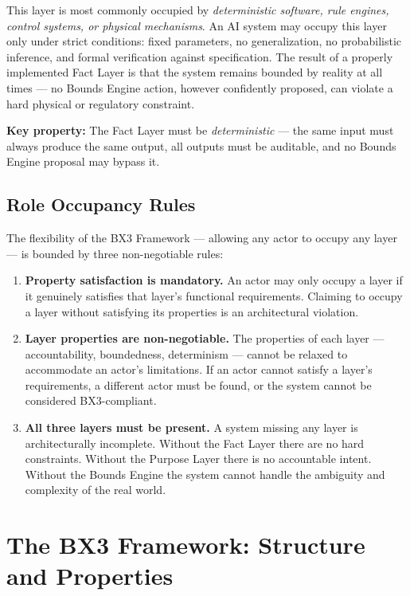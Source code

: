 \documentclass[12pt]{article}
\begin{document}
This layer is most commonly occupied by \textit{deterministic software, rule engines, control systems, or physical mechanisms}. An AI system may occupy this layer only under strict conditions: fixed parameters, no generalization, no probabilistic inference, and formal verification against specification. The result of a properly implemented Fact Layer is that the system remains bounded by reality at all times --- no Bounds Engine action, however confidently proposed, can violate a hard physical or regulatory constraint.

\textbf{Key property:} The Fact Layer must be \textit{deterministic} --- the same input must always produce the same output, all outputs must be auditable, and no Bounds Engine proposal may bypass it.

\subsection{Role Occupancy Rules}

The flexibility of the BX3 Framework --- allowing any actor to occupy any layer --- is bounded by three non-negotiable rules:

\begin{enumerate}[noitemsep]
    \item \textbf{Property satisfaction is mandatory.} An actor may only occupy a layer if it genuinely satisfies that layer's functional requirements. Claiming to occupy a layer without satisfying its properties is an architectural violation.
    \item \textbf{Layer properties are non-negotiable.} The properties of each layer --- accountability, boundedness, determinism --- cannot be relaxed to accommodate an actor's limitations. If an actor cannot satisfy a layer's requirements, a different actor must be found, or the system cannot be considered BX3-compliant.
    \item \textbf{All three layers must be present.} A system missing any layer is architecturally incomplete. Without the Fact Layer there are no hard constraints. Without the Purpose Layer there is no accountable intent. Without the Bounds Engine the system cannot handle the ambiguity and complexity of the real world.
\end{enumerate}

\section{The BX3 Framework: Structure and Properties}
\label{sec:structure}
\end{document}
